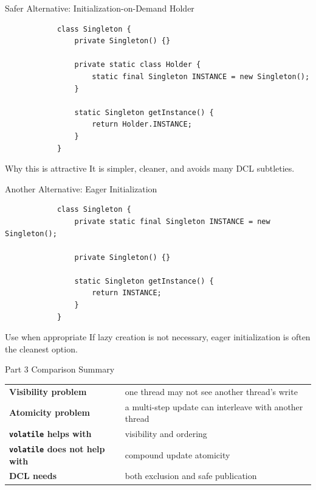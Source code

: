 \documentclass[aspectratio=169,11pt]{beamer}
\begin{document}
	\begin{frame}[fragile]{Safer Alternative: Initialization-on-Demand Holder}
		\begin{lstlisting}
			class Singleton {
				private Singleton() {}
				
				private static class Holder {
					static final Singleton INSTANCE = new Singleton();
				}
				
				static Singleton getInstance() {
					return Holder.INSTANCE;
				}
			}
		\end{lstlisting}
		
		\vspace{0.25cm}
		
		\begin{block}{Why this is attractive}
			It is simpler, cleaner, and avoids many DCL subtleties.
		\end{block}
	\end{frame}
	
	\begin{frame}[fragile]{Another Alternative: Eager Initialization}
		\begin{lstlisting}
			class Singleton {
				private static final Singleton INSTANCE = new Singleton();
				
				private Singleton() {}
				
				static Singleton getInstance() {
					return INSTANCE;
				}
			}
		\end{lstlisting}
		
		\vspace{0.25cm}
		
		\begin{exampleblock}{Use when appropriate}
			If lazy creation is not necessary, eager initialization is often the cleanest option.
		\end{exampleblock}
	\end{frame}
	
	\begin{frame}{Part 3 Comparison Summary}
		\centering
		\begin{tabular}{>{\bfseries}m{3.2cm} m{6.8cm}}
			Visibility problem & one thread may not see another thread's write \\
			Atomicity problem & a multi-step update can interleave with another thread \\
			\texttt{volatile} helps with & visibility and ordering \\
			\texttt{volatile} does not help with & compound update atomicity \\
			DCL needs & both exclusion and safe publication \\
		\end{tabular}
	\end{frame}
	
\end{document}
